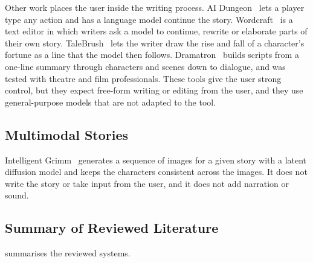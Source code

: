Other work places the user inside the writing process. AI Dungeon~\cite{walton2019aidungeon} lets a player type any action and has a language model continue the story. Wordcraft~\cite{yuan2022wordcraft} is a text editor in which writers ask a model to continue, rewrite or elaborate parts of their own story. TaleBrush~\cite{chung2022talebrush} lets the writer draw the rise and fall of a character's fortune as a line that the model then follows. Dramatron~\cite{mirowski2023dramatron} builds scripts from a one-line summary through characters and scenes down to dialogue, and was tested with theatre and film professionals. These tools give the user strong control, but they expect free-form writing or editing from the user, and they use general-purpose models that are not adapted to the tool.

\subsection{Multimodal Stories}

Intelligent Grimm~\cite{liu2024grimm} generates a sequence of images for a given story with a latent diffusion model and keeps the characters consistent across the images. It does not write the story or take input from the user, and it does not add narration or sound.

\subsection{Summary of Reviewed Literature}

 summarises the reviewed systems.

